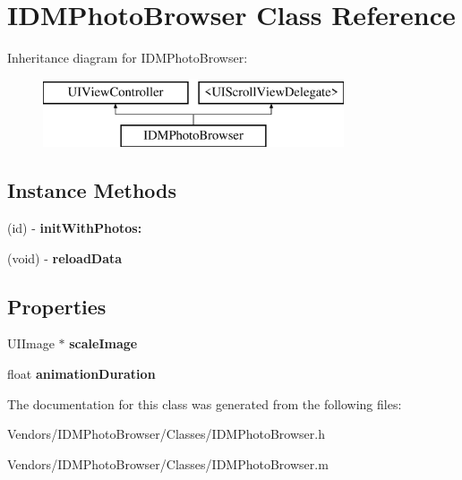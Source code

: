 \hypertarget{interface_i_d_m_photo_browser}{}\section{I\+D\+M\+Photo\+Browser Class Reference}
\label{interface_i_d_m_photo_browser}
Inheritance diagram for I\+D\+M\+Photo\+Browser\+:\begin{figure}[H]
\begin{center}
\leavevmode
\includegraphics[height=2.000000cm]{interface_i_d_m_photo_browser}
\end{center}
\end{figure}
\subsection*{Instance Methods}
\begin{DoxyCompactItemize}
\item 
\hypertarget{interface_i_d_m_photo_browser_ac9ebb45338efbfdbea6416ce55fe1bf4}{}(id) -\/ {\bfseries init\+With\+Photos\+:}\label{interface_i_d_m_photo_browser_ac9ebb45338efbfdbea6416ce55fe1bf4}

\item 
\hypertarget{interface_i_d_m_photo_browser_acd4f2029eed202bf191cb0d6b78b9203}{}(void) -\/ {\bfseries reload\+Data}\label{interface_i_d_m_photo_browser_acd4f2029eed202bf191cb0d6b78b9203}

\end{DoxyCompactItemize}
\subsection*{Properties}
\begin{DoxyCompactItemize}
\item 
\hypertarget{interface_i_d_m_photo_browser_ae26d756017bbdef63882c52dc8938c84}{}U\+I\+Image $\ast$ {\bfseries scale\+Image}\label{interface_i_d_m_photo_browser_ae26d756017bbdef63882c52dc8938c84}

\item 
\hypertarget{interface_i_d_m_photo_browser_aafc4f0bc46fa63b7bed0e3c9b20da399}{}float {\bfseries animation\+Duration}\label{interface_i_d_m_photo_browser_aafc4f0bc46fa63b7bed0e3c9b20da399}

\end{DoxyCompactItemize}


The documentation for this class was generated from the following files\+:\begin{DoxyCompactItemize}
\item 
Vendors/\+I\+D\+M\+Photo\+Browser/\+Classes/I\+D\+M\+Photo\+Browser.\+h\item 
Vendors/\+I\+D\+M\+Photo\+Browser/\+Classes/I\+D\+M\+Photo\+Browser.\+m\end{DoxyCompactItemize}
